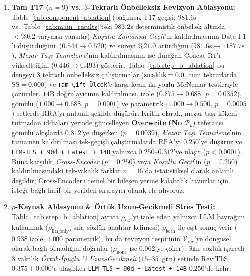 ﻿\documentclass[journal]{IEEEtran}
\begin{document}
\begin{enumerate}
    \item \textbf{Tam \textbf{T17} ($n=9$) vs.\ $3$-Tekrarl{\i} \"{O}nbelleksiz Revizyon Ablasyonu:} Tablo~\ref{tab:component_ablation} (ba\u{g}{\i}ms{\i}z T17 ge\c{c}i\c{s}i; $981.6\text{s}$ vs.\ Tablo~\ref{tab:main_results}'teki $983.2\text{s}$ deterministik \"{o}nbellek alt{\i}nda $<\%0.2$ varyans{\i} yans{\i}t{\i}r) \textit{Ko\c{s}ullu Zamansal Ge\c{c}it}'in kald{\i}r{\i}lmas{\i}n{\i}n $\text{Date-F1}$'i d\"{u}\c{s}\"{u}rd\"{u}\u{g}\"{u}n\"{u} ($0.544 \to 0.520$) ve s\"{u}reyi $\%21.0$ art{\i}rd{\i}\u{g}{\i}n{\i} ($981.6\text{s} \to 1187.7\text{s}$), \textit{Mezar Ta\c{s}{\i} Temizleme}'nin kald{\i}r{\i}lmas{\i}n{\i}n ise dura\u{g}an $\text{Concat-R1}$'i y\"{u}kseltti\u{g}ini ($0.446 \to 0.493$) g\"{o}sterir. Tablo~\ref{tab:step_b_ablation} bu dengeyi $3$ tekrarl{\i} \"{o}nbelleksiz \c{c}al{\i}\c{s}t{\i}rmalar ($\text{s{\i}cakl{\i}k}=0.0$, t\"{u}m tekrarlarda $\text{SS}=0.000$) ve \texttt{Tam \c{C}ift-\"{O}l\c{c}ek}'e kar\c{s}{\i} kesin iki-y\"{o}nl\"{u} McNemar testleriyle \c{c}\"{o}z\"{u}mler. $14\text{B}$ do\u{g}rulay{\i}c{\i}n{\i}n kald{\i}r{\i}lmas{\i}, izole ($0.875 \to 0.688$, $p=0.0352$), g\"{o}m\"{u}l\"{u} ($1.000 \to 0.688$, $p=0.0001$) ve parametrik ($1.000 \to 0.500$, $p=0.0005$) setlerde $\text{RRA}$'y{\i} anlaml{\i} \c{s}ekilde d\"{u}\c{s}\"{u}r\"{u}r. Kritik olarak, mezar ta\c{s}{\i} k\"{o}keni tutmadan iddialar{\i} yerinde g\"{u}ncelleyen \textbf{Overwrite (No $\mathcal{P}_k$)} referans{\i} g\"{o}m\"{u}l\"{u} ak{\i}\c{s}larda $0.812$'ye d\"{u}\c{s}erken ($p=0.0039$), \textit{Mezar Ta\c{s}{\i} Temizleme}'nin tamamen kald{\i}r{\i}lmas{\i} tek-ge\c{c}i\c{s}li \c{c}al{\i}\c{s}t{\i}rmalarda $\text{RRA}$'y{\i} $0.250$'ye d\"{u}\c{s}\"{u}r\"{u}r ve \texttt{LLM-TLS + 90d + Latest + 14B} yaln{\i}zca $0.250\text{--}0.312$'ye ula\c{s}{\i}r ($p < 0.0001$). Buna kar\c{s}{\i}l{\i}k, \textit{Cross-Encoder} ($p=0.250$) veya \textit{Ko\c{s}ullu Ge\c{c}it}'in ($p=0.250$) kald{\i}r{\i}lmas{\i}ndaki tek-vakal{\i}k farklar $n=16$'da istatistiksel olarak anlaml{\i} de\u{g}ildir; Cross-Encoder'{\i} temel bir bile\c{s}en yerine kalabal{\i}k havuzlar i\c{c}in iste\u{g}e ba\u{g}l{\i} hafif bir yeniden s{\i}ralay{\i}c{\i} olarak ele al{\i}yoruz.
    \item \textbf{$\rho$-Kaynak Ablasyonu \& \"{O}rt\"{u}k Uzun-Gecikmeli Stres Testi:} Tablo~\ref{tab:step_b_ablation} ayr{\i}ca $\rho_{i,j}$'yi izole eder: yaln{\i}zca LLM bayra\u{g}{\i}n{\i} kullanmak ($\rho_{\text{llm\_only}}$, s{\i}f{\i}r s\"{o}zl\"{u}k anahtar kelimesi) $\rho_{\text{both}}$ ile e\c{s}it sonu\c{c} verir ($0.938$ izole, $1.000$ parametrik), bu da revizyon tespitinin $\mathcal{V}_{\text{rev}}$'ye d\"{o}ng\"{u}sel olarak ba\u{g}l{\i} olmad{\i}\u{g}{\i}n{\i} do\u{g}rular ($\rho_{\text{none}}$ ise $0.062$'ye \c{c}\"{o}ker). S{\i}f{\i}r s\"{o}zl\"{u}k i\c{s}aretli $8$ vakal{\i}k \textit{\"{O}rt\"{u}k-\.{I}pu\c{c}lu \& Uzun-Gecikmeli} ($15\text{--}35$~g\"{u}n) setinde ReviTLS $0.375 \pm 0.000$'a ula\c{s}{\i}rken \texttt{LLM-TLS + 90d + Latest + 14B} $0.250$'de kal{\i}r.

\end{enumerate}
\end{document}
